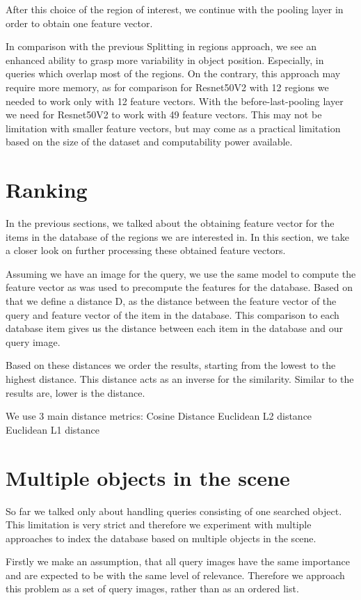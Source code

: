 After this choice of the region of interest, we continue with the pooling layer in order to obtain one feature vector.

In comparison with the previous Splitting in regions approach, we see an enhanced ability to grasp more variability in object position. Especially, in queries which overlap most of the regions. On the contrary, this approach may require more memory, as for comparison for Resnet50V2 with 12 regions we needed to work only with 12 feature vectors. With the before-last-pooling layer we need for Resnet50V2 to work with 49 feature vectors. This may not be limitation with smaller feature vectors, but may come as a practical limitation based on the size of the dataset and computability power available.


\section{Ranking}
In the previous sections, we talked about the obtaining feature vector for the items in the database of the regions we are interested in. In this section, we take a closer look on further processing these obtained feature vectors.

Assuming we have an image for the query, we use the same model to compute the feature vector as was used to precompute the features for the database. Based on that we define a distance D, as the distance between the feature vector of the query and feature vector of the item in the database. This comparison to each database item gives us the distance between each item in the database and our query image.

Based on these distances we order the results, starting from the lowest to the highest distance. This distance acts as an inverse for the similarity. Similar to the results are, lower is the distance.

We use 3 main distance metrics:
Cosine Distance
Euclidean L2 distance
Euclidean L1 distance

\section{Multiple objects in the scene}

So far we talked only about handling queries consisting of one searched object. This limitation is very strict and therefore we experiment with multiple approaches to index the database based on multiple objects in the scene.

Firstly we make an assumption, that all query images have the same importance and are expected to be with the same level of relevance. Therefore we approach this problem as a set of query images, rather than as an ordered list.

